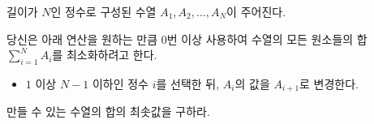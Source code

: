 길이가 $N$인 정수로 구성된 수열 $A_1, A_2, ..., A_N$이 주어진다.

당신은 아래 연산을 원하는 만큼 0번 이상 사용하여 수열의 모든 원소들의 합 $\sum_{i=1}^N A_i$를 최소화하려고 한다.

\begin{itemize}
  \item $1$ 이상 $N-1$ 이하인 정수 $i$를 선택한 뒤, $A_i$의 값을 $A_{i+1}$로 변경한다.
\end{itemize}

만들 수 있는 수열의 합의 최솟값을 구하라.